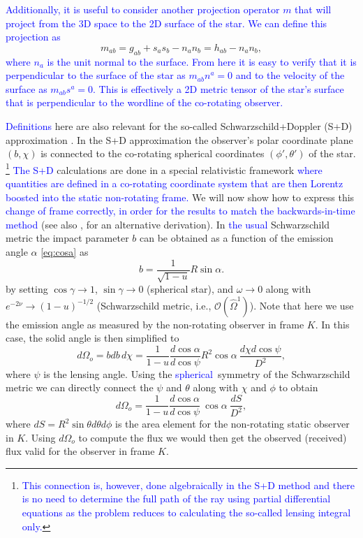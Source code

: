 \documentclass{aa}
\newcommand{\be}{\begin{equation}}
\newcommand{\ee}{\end{equation}}
\newcommand{\refe}[1]{\textcolor{blue}{{#1}}}
\newcommand{\sch}{Schwarzschild }
\newcommand{\Ob}{\ensuremath{\hat{\Omega}}}
\begin{document}
\refe{Additionally, it is useful to consider another projection operator $m$ that will project from the 3D space to the 2D surface of the star.}
\refe{We can define this projection as}
\be\label{eq:2dmetric}
m_{ab} = g_{ab} + s_a s_b - n_a n_b = h_{ab} - n_a n_b,
\ee
\refe{where $n_a$ is the unit normal to the surface.}
\refe{From here it is easy to verify that it is perpendicular to the surface of the star as $m_{ab} n^a = 0$ and to the velocity of the surface as $m_{ab} s^a = 0$.}
\refe{This is effectively a 2D metric tensor of the star's surface that is perpendicular to the wordline of the co-rotating observer.}


\refe{Definitions} here are also relevant for the so-called Schwarzschild+Doppler (S+D) approximation \cite[see e.g.,][]{PB06}.
In the S+D approximation the observer's polar coordinate plane $(b,\chi)$ is connected to the co-rotating spherical coordinates $(\phi', \theta')$ of the star.%
\footnote{ \refe{This connection is, however, done algebraically in the S+D method and there is no need to determine the full path of the ray using partial differential equations as the problem reduces to calculating the so-called lensing integral only.}
}
\refe{The S+D} calculations are done in a special relativistic framework \refe{where quantities are defined in a co-rotating coordinate system that are then Lorentz boosted into the static non-rotating frame.}
We will now show how to express this \refe{change of frame correctly, in order for the results to match the backwards-in-time method} (see also \citealt{CML07}, for an alternative derivation).
In \refe{the usual} \sch metric the impact parameter $b$ can be obtained as a function of the emission angle $\alpha$ \eqref{eq:cosa} as
\be
b = \frac{1}{\sqrt{1-u}} R \sin\alpha.
\ee
by setting $\cos\gamma \rightarrow 1$, $\sin\gamma \rightarrow 0$ (spherical star), and $\omega \rightarrow 0$ along with $e^{-2\nu} \rightarrow (1-u)^{-1/2}$ (\sch metric, i.e., $\mathcal{O}(\Ob^1)$).
Note that here we use the emission angle as measured by the non-rotating observer in frame $K$.
In this case, the solid angle is then simplified to 
\be
d\Omega_o = bdb \, d\chi = \frac{1}{1-u} \frac{d \cos\alpha}{d \cos\psi} R^2 \cos\alpha ~ \frac{d\chi d\cos\psi}{D^2},
\ee
where $\psi$ is the lensing angle.
Using the \refe{spherical} symmetry of the \sch metric we can directly connect the $\psi$ and $\theta$ along with $\chi$ and $\phi$ to obtain
\be
d\Omega_o = \frac{1}{1-u} \frac{d \cos\alpha}{d \cos\psi} ~\cos\alpha ~ \frac{dS}{D^2},
\ee
where $dS = R^2 \sin\theta d\theta d\phi$ is the area element for the non-rotating static observer in $K$.
Using $d\Omega_o$ to compute the flux we would then get the observed (received) flux valid for the observer in frame $K$.
\end{document}
